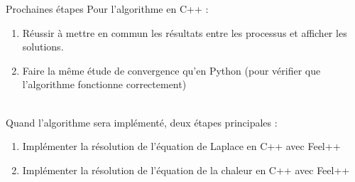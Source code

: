 \documentclass[10pt,xcolor={table,dvipsnames},t]{beamer}
\begin{document}
	\begin{frame}{Prochaines étapes}
		Pour l'algorithme en C++ :
		\begin{enumerate}[\textbullet]
			\item Réussir à mettre en commun les résultats entre les processus et afficher les solutions.
			\item Faire la même étude de convergence qu'en Python (pour vérifier que l'algorithme fonctionne correctement)
		\end{enumerate}
		\; \\
		Quand l'algorithme sera implémenté, deux étapes principales :
		\begin{enumerate}[\textbullet]
			\item Implémenter la résolution de l'équation de Laplace en C++ avec Feel++
			\item Implémenter la résolution de l'équation de la chaleur en C++ avec Feel++
		\end{enumerate}
	\end{frame}
\end{document}
